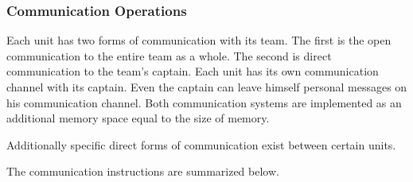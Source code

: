 \documentclass{article}
\begin{document}
\subsubsection{Communication Operations}

Each unit has two forms of communication with its team. The first is the open
communication to the entire team as a whole. The second is direct communication
to the team's captain. Each unit has its own communication channel with its
captain. Even the captain can leave himself personal messages on his
communication channel. Both communication systems are implemented as an
additional memory space equal to the size of memory.

Additionally specific direct forms of communication exist between certain units.

The communication instructions are summarized below.
\end{document}
